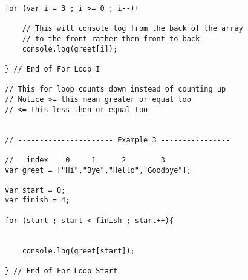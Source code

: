 \documentclass[12pt, letterpaper]{article}
\begin{document}
\begin{lstlisting}
for (var i = 3 ; i >= 0 ; i--){

	// This will console log from the back of the array
	// to the front rather then front to back
	console.log(greet[i]);

} // End of For Loop I

// This for loop counts down instead of counting up
// Notice >= this mean greater or equal too
// <= this less then or equal too


// ---------------------- Example 3 ----------------

//   index    0     1      2        3
var greet = ["Hi","Bye","Hello","Goodbye"];

var start = 0;
var finish = 4;

for (start ; start < finish ; start++){


	console.log(greet[start]);

} // End of For Loop Start


\end{lstlisting}
\end{document}

